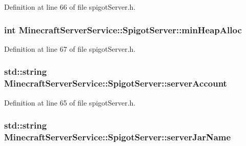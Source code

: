 Definition at line 66 of file spigot\+Server.\+h.

\subsubsection[{\texorpdfstring{min\+Heap\+Alloc}{minHeapAlloc}}]{\setlength{\rightskip}{0pt plus 5cm}int Minecraft\+Server\+Service\+::\+Spigot\+Server\+::min\+Heap\+Alloc\hspace{0.3cm}{\ttfamily [protected]}}\hypertarget{class_minecraft_server_service_1_1_spigot_server_a4ef50266a24dccd4f0d61d877567b55d}{}\label{class_minecraft_server_service_1_1_spigot_server_a4ef50266a24dccd4f0d61d877567b55d}


Definition at line 67 of file spigot\+Server.\+h.

\subsubsection[{\texorpdfstring{server\+Account}{serverAccount}}]{\setlength{\rightskip}{0pt plus 5cm}std\+::string Minecraft\+Server\+Service\+::\+Spigot\+Server\+::server\+Account\hspace{0.3cm}{\ttfamily [protected]}}\hypertarget{class_minecraft_server_service_1_1_spigot_server_a7d824cedf0faf1a5dcc6e4ab54d9443b}{}\label{class_minecraft_server_service_1_1_spigot_server_a7d824cedf0faf1a5dcc6e4ab54d9443b}


Definition at line 65 of file spigot\+Server.\+h.

\subsubsection[{\texorpdfstring{server\+Jar\+Name}{serverJarName}}]{\setlength{\rightskip}{0pt plus 5cm}std\+::string Minecraft\+Server\+Service\+::\+Spigot\+Server\+::server\+Jar\+Name\hspace{0.3cm}{\ttfamily [protected]}}\hypertarget{class_minecraft_server_service_1_1_spigot_server_a603128a2f6ce44b71ee74b601f1a24e0}{}\label{class_minecraft_server_service_1_1_spigot_server_a603128a2f6ce44b71ee74b601f1a24e0}



